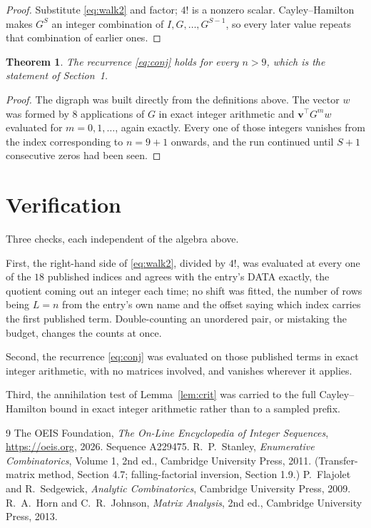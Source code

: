 \documentclass[11pt,a4paper]{article}
\theoremstyle{plain}
\newtheorem{theorem}{Theorem}
\theoremstyle{definition}
\begin{document}
\begin{proof}
Substitute \eqref{eq:walk2} and factor; $4!$ is a nonzero scalar. Cayley--Hamilton
makes $G^{S}$ an integer combination of $I,G,\dots,G^{S-1}$, so every later value repeats
that combination of earlier ones.
\end{proof}

\begin{theorem}
The recurrence \eqref{eq:conj} holds for every $n>9$, which is the statement of
Section~1.
\end{theorem}

\begin{proof}
The digraph was built directly from the definitions above. The vector $w$ was formed by
$8$ applications of $G$ in exact integer arithmetic and $\mathbf{v}^{\!\top}G^{m}w$
evaluated for $m=0,1,\dots$, again exactly. Every one of those integers vanishes from the
index corresponding to $n=9+1$ onwards, and the run continued until $S+1$ consecutive
zeros had been seen.
\end{proof}

\section{Verification}

Three checks, each independent of the algebra above.

First, the right-hand side of \eqref{eq:walk2}, divided by $4!$, was evaluated at every
one of the $18$ published indices and agrees with the entry's DATA exactly, the quotient
coming out an integer each time; no shift was fitted, the number of rows being $L=n$
from the entry's own name and the offset saying which index carries the first published term.
Double-counting an unordered pair, or mistaking the budget, changes the counts at once.

Second, the recurrence \eqref{eq:conj} was evaluated on those published terms in exact
integer arithmetic, with no matrices involved, and vanishes wherever it applies.

Third, the annihilation test of Lemma~\ref{lem:crit} was carried to the full
Cayley--Hamilton bound in exact integer arithmetic rather than to a sampled prefix.

\begin{thebibliography}{9}
 The OEIS Foundation, \emph{The On-Line Encyclopedia of Integer
Sequences}, \url{https://oeis.org}, 2026. Sequence A229475.
 R.~P.~Stanley, \emph{Enumerative Combinatorics}, Volume 1, 2nd ed.,
Cambridge University Press, 2011. (Transfer-matrix method, Section 4.7; falling-factorial
inversion, Section 1.9.)
 P.~Flajolet and R.~Sedgewick, \emph{Analytic Combinatorics}, Cambridge
University Press, 2009.
 R.~A.~Horn and C.~R.~Johnson, \emph{Matrix Analysis}, 2nd ed., Cambridge
University Press, 2013.
\end{thebibliography}
\end{document}
